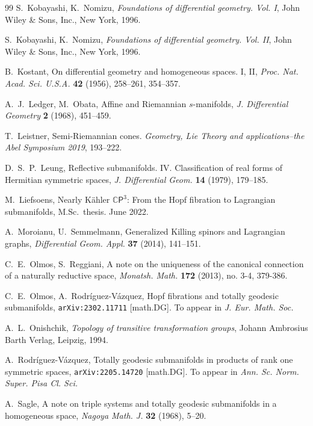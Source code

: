 \documentclass[11pt,a4paper,final]{amsart}
\newcommand{\s}{\mathsf}
\newcommand{\C}{\mathbb{C}}
\theoremstyle{definition}
\begin{document}
\begin{thebibliography}{99}
	S.~Kobayashi, K.~Nomizu, \textit{Foundations of differential geometry. Vol. I}, John Wiley \& Sons, Inc., New York, 1996.
	
	S.~Kobayashi, K.~Nomizu, \textit{Foundations of differential geometry. Vol. II}, John Wiley \& Sons, Inc., New York, 1996.
	
	B.~Kostant,	On differential geometry and homogeneous spaces. I, II, \textit{Proc. Nat. Acad. Sci. U.S.A.} \textbf{42} (1956), 258--261, 354--357.
	
	A.~J.~Ledger, M.~Obata, Affine and Riemannian $s$-manifolds, \textit{J. Differential Geometry} \textbf{2} (1968), 451--459.

	T.~Leistner, Semi-Riemannian cones. \textit{Geometry, Lie Theory and applications--the Abel Symposium 2019}, 193--222.

	D.~S.~P.~Leung, Reflective submanifolds.  IV. Classification of real forms of Hermitian symmetric spaces, \textit{J. Differential Geom.} \textbf{14} (1979),  179--185. 

	M.~Liefsoens, Nearly Kähler $\C\s{P}^3$: From the Hopf fibration to Lagrangian submanifolds, M.Sc.\ thesis. June 2022.

	A.~Moroianu,  U.~Semmelmann, Generalized Killing spinors and Lagrangian graphs, \textit{Differential Geom. Appl.} \textbf{37} (2014), 141--151.
	
	C.~E.~Olmos, S.~Reggiani, A note on the uniqueness of the canonical connection of a naturally reductive space, \textit{Monatsh. Math.} \textbf{172} (2013), no. 3-4, 379-386.

	C.~E.~Olmos, A.~Rodr\'{i}guez-V\'{a}zquez, Hopf fibrations and totally geodesic submanifolds, \verb|arXiv:2302.11711| [math.DG]. To appear in \textit{J. Eur. Math. Soc.}

	A.~L.~Onishchik, \textit{Topology of transitive transformation groups},	Johann Ambrosius Barth Verlag, Leipzig, 1994.

	A.~Rodr\'{i}guez-V\'{a}zquez,
	Totally geodesic submanifolds in products of rank one symmetric spaces, \verb|arXiv:2205.14720| [math.DG].
	To appear in \textit{Ann. Sc. Norm. Super. Pisa Cl. Sci.}

	A.~Sagle, A note on triple systems and totally geodesic submanifolds in a homogeneous space, \textit{Nagoya Math. J.} \textbf{32} (1968), 5--20.


\end{thebibliography}
\end{document}
